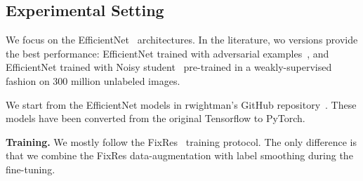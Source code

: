 \documentclass{article}
\begin{document}
\subsection{Experimental Setting}

We focus on the EfficientNet~\cite{tan2019efficientnet} architectures. 
In the literature, wo versions provide the best performance:
EfficientNet trained with adversarial examples~\cite{Xie2019AdversarialEI}, and  
EfficientNet trained with Noisy student~\cite{Xie2019SelftrainingWN} pre-trained in a weakly-supervised fashion on 300 million unlabeled images.

We start from the EfficientNet models in rwightman's GitHub repository~\cite{pretrainedEffnet}. 
These models have been converted from the original Tensorflow to PyTorch. 

\bigskip \noindent
\textbf{Training. \quad}
We mostly follow the FixRes~\cite{Touvron2019FixRes} training protocol. 
The only difference is that we combine the FixRes data-augmentation with label smoothing during the fine-tuning.
\end{document}
